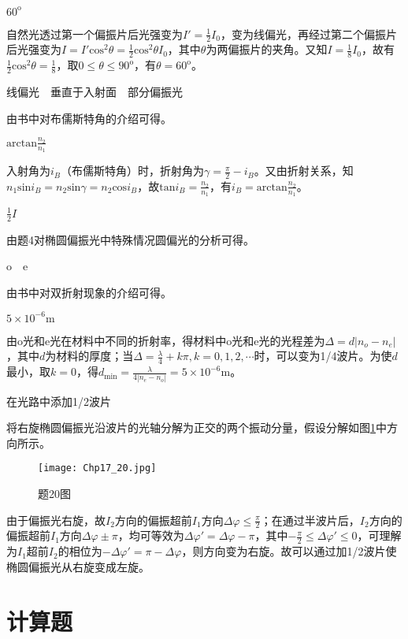 \exercise $60^{\mathrm{o}}$

\solve 自然光透过第一个偏振片后光强变为$I'=\frac{1}{2}I_0$，变为线偏光，再经过第二个偏振片后光强变为$I=I'\mathrm{cos}^2\theta=\frac{1}{2}\mathrm{cos}^2\theta I_0$，其中$\theta$为两偏振片的夹角。又知$I=\frac{1}{8}I_0$，故有$\frac{1}{2}\mathrm{cos}^2\theta=\frac{1}{8}$，取$0\leqslant\theta\leqslant 90^{\mathrm{o}}$，有$\theta=60^{\mathrm{o}}$。

\exercise 线偏光$\quad$垂直于入射面$\quad$部分偏振光

\solve 由书中对布儒斯特角的介绍可得。

\exercise $\mathrm{arctan}\frac{n_2}{n_1}$

\solve 入射角为$i_B$（布儒斯特角）时，折射角为$\gamma=\frac{\pi}{2}-i_B$。又由折射关系，知$n_1\mathrm{sin}i_B=n_2\mathrm{sin}\gamma=n_2\mathrm{cos}i_B$，故$\mathrm{tan}i_B=\frac{n_2}{n_1}$，有$i_B=\mathrm{arctan}\frac{n_2}{n_1}$。

\exercise $\frac{1}{2}I$

\solve 由题4对椭圆偏振光中特殊情况圆偏光的分析可得。

\exercise o$\quad$e

由书中对双折射现象的介绍可得。

\exercise $5\times 10^{-6}\mathrm{m}$

\solve 由o光和e光在材料中不同的折射率，得材料中o光和e光的光程差为$\Delta=d|n_o-n_e|$，其中$d$为材料的厚度；当$\Delta=\frac{\lambda}{4}+k\pi,k=0,1,2,\cdots$时，可以变为1/4波片。为使$d$最小，取$k=0$，得$d_{\mathrm{min}}=\frac{\lambda}{4|n_e-n_o|}=5\times 10^{-6}\mathrm{m}$。

\exercise 在光路中添加1/2波片

\solve 将右旋椭圆偏振光沿波片的光轴分解为正交的两个振动分量，假设分解如图\ref{20}中方向所示。

\begin{figure}[htbp]
	\centering
	\texttt{[image: Chp17\_20.jpg]}
	\caption{题20图}
	\label{20}
\end{figure}

由于偏振光右旋，故$I_2$方向的偏振超前$I_1$方向$\Delta \varphi\leqslant\frac{\pi}{2}$；在通过半波片后，$I_2$方向的偏振超前$I_1$方向$\Delta \varphi\pm\pi$，均可等效为$\Delta \varphi'=\Delta \varphi-\pi$，其中$-\frac{\pi}{2}\leqslant\Delta \varphi'\leqslant0$，可理解为$I_1$超前$I_2$的相位为$-\Delta \varphi'=\pi-\Delta \varphi$，则方向变为右旋。故可以通过加1/2波片使椭圆偏振光从右旋变成左旋。

\section{计算题}
\exercise 

